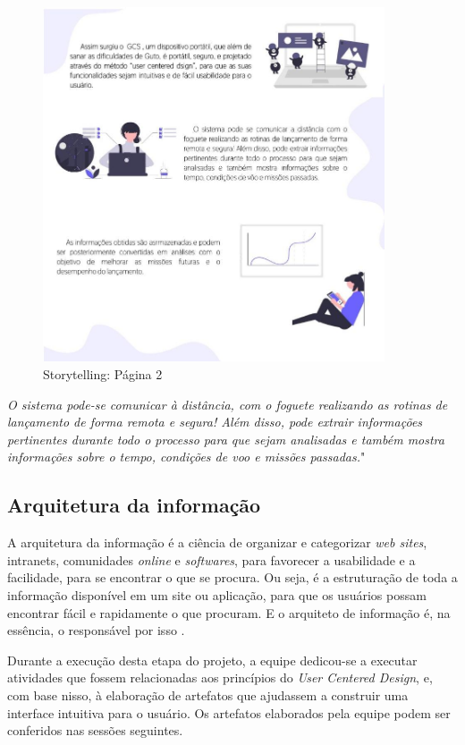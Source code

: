 \begin{figure}[H]
\centering
\includegraphics[width=0.9\textwidth]{figuras/sotytelling2.jpg}
\caption{Storytelling: Página 2}
\label{fig:storytelling02}
\end{figure}

\textit{O sistema pode-se comunicar à distância, com o foguete realizando as rotinas de lançamento de forma remota e segura! Além disso, pode extrair informações pertinentes durante todo o processo para que sejam analisadas e também mostra informações sobre o tempo, condições de voo e missões passadas.}"

\subsection{Arquitetura da informação}

\par A arquitetura da informação é a ciência de organizar e categorizar \textit{web sites}, intranets, comunidades \textit{online} e \textit{softwares}, para favorecer a usabilidade e a facilidade, para se encontrar o que se procura. Ou seja, é a estruturação de toda a informação disponível em um site ou aplicação, para que os usuários possam encontrar fácil e rapidamente o que procuram. E o arquiteto de informação é, na essência, o responsável por isso \cite{de2011fundamentos}. 

\par Durante a execução desta etapa do projeto, a equipe dedicou-se a executar atividades que fossem relacionadas aos princípios do \textit{User Centered Design}, e, com base nisso, à elaboração de artefatos que ajudassem a construir uma interface intuitiva para o usuário. Os artefatos elaborados pela equipe podem ser conferidos nas sessões seguintes.

